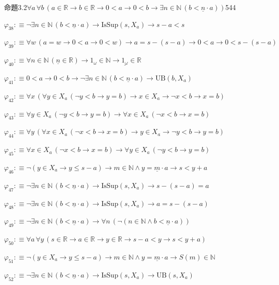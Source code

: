 \begin{fullproof}{命題3.2}{$\forall a\,\forall b\,(a \in \mathbb{R} \to b \in \mathbb{R} \to 0 < a \to 0 < b \to \exists n \in \mathbb{N}\,(b < \underline{n} \cdot a))$}{544}
\begin{abbrevlist}
\item $\varphi_{38} :\equiv \neg \exists n \in \mathbb{N}\,(b < \underline{n} \cdot a) \to \mathrm{IsSup}(s,X_{a}) \to s - a < s$
\item $\varphi_{39} :\equiv \forall w\,(a = w \to 0 < a \to 0 < w) \to a = s - (s - a) \to 0 < a \to 0 < s - (s - a)$
\item $\varphi_{40} :\equiv \forall n \in \mathbb{N}\,(\underline{n} \in \mathbb{R}) \to 1_{\omega} \in \mathbb{N} \to \underline{1_{\omega}} \in \mathbb{R}$
\item $\varphi_{41} :\equiv 0 < a \to 0 < b \to \neg \exists n \in \mathbb{N}\,(b < \underline{n} \cdot a) \to \mathrm{UB}(b,X_{a})$
\item $\varphi_{42} :\equiv \forall x\,(\forall y \in X_{a}\,(\neg y < b \to y = b) \to x \in X_{a} \to \neg x < b \to x = b)$
\item $\varphi_{43} :\equiv \forall y \in X_{a}\,(\neg y < b \to y = b) \to \forall x \in X_{a}\,(\neg x < b \to x = b)$
\item $\varphi_{44} :\equiv \forall y\,(\forall x \in X_{a}\,(\neg x < b \to x = b) \to y \in X_{a} \to \neg y < b \to y = b)$
\item $\varphi_{45} :\equiv \forall x \in X_{a}\,(\neg x < b \to x = b) \to \forall y \in X_{a}\,(\neg y < b \to y = b)$
\item $\varphi_{46} :\equiv \neg (y \in X_{a} \to y \leq s - a) \to m \in \mathbb{N} \land y = \underline{m} \cdot a \to s < y + a$
\item $\varphi_{47} :\equiv \neg \exists n \in \mathbb{N}\,(b < \underline{n} \cdot a) \to \mathrm{IsSup}(s,X_{a}) \to s - (s - a) = a$
\item $\varphi_{48} :\equiv \neg \exists n \in \mathbb{N}\,(b < \underline{n} \cdot a) \to \mathrm{IsSup}(s,X_{a}) \to a = s - (s - a)$
\item $\varphi_{49} :\equiv \neg \exists n \in \mathbb{N}\,(b < \underline{n} \cdot a) \to \forall n\,(\neg (n \in \mathbb{N} \land b < \underline{n} \cdot a))$
\item $\varphi_{50} :\equiv \forall a\,\forall y\,(s \in \mathbb{R} \to a \in \mathbb{R} \to y \in \mathbb{R} \to s - a < y \to s < y + a)$
\item $\varphi_{51} :\equiv \neg (y \in X_{a} \to y \leq s - a) \to m \in \mathbb{N} \land y = \underline{m} \cdot a \to S(m) \in \mathbb{N}$
\item $\varphi_{52} :\equiv \neg \exists n \in \mathbb{N}\,(b < \underline{n} \cdot a) \to \mathrm{IsSup}(s,X_{a}) \to \mathrm{UB}(s,X_{a})$

\end{abbrevlist}
\end{fullproof}
